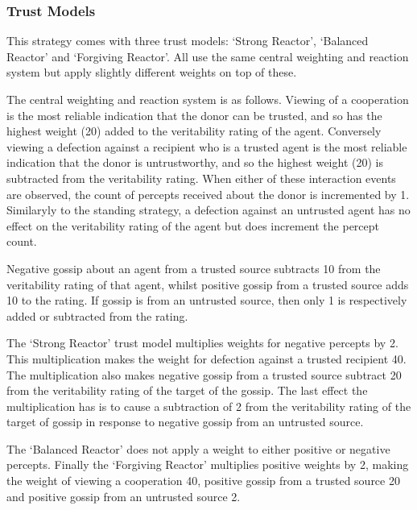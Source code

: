 \documentclass[]{final_report}
\begin{document}
\subsubsection{Trust Models}
This strategy comes with three trust models: `Strong Reactor', `Balanced Reactor' and `Forgiving Reactor'. All use the same central weighting and reaction system but apply slightly different weights on top of these.\par 
The central weighting and reaction system is as follows. Viewing of a cooperation is the most reliable indication that the donor can be trusted, and so has the highest weight (20) added to the veritability rating of the agent. Conversely viewing a defection against a recipient who is a trusted agent is the most reliable indication that the donor is untrustworthy, and so the highest weight (20) is subtracted from the veritability rating. When either of these interaction events are observed, the count of percepts received about the donor is incremented by 1. Similaryly to the standing strategy, a defection against an untrusted agent has no effect on the veritability rating of the agent but does increment the percept count.\par
Negative gossip about an agent from a trusted source subtracts 10 from the veritability rating of that agent, whilst positive gossip from a trusted source adds 10 to the rating. If gossip is from an untrusted source, then only 1 is respectively added or subtracted from the rating.\par 
The `Strong Reactor' trust model multiplies weights for negative percepts by 2. This multiplication makes the weight for defection against a trusted recipient 40. The multiplication also makes negative gossip from a trusted source subtract 20 from the veritability rating of the target of the gossip. The last effect the multiplication has is to cause a subtraction of 2 from the veritability rating of the target of gossip in response to negative gossip from an untrusted source.\par 
The `Balanced Reactor' does not apply a weight to either positive or negative percepts. Finally the `Forgiving Reactor' multiplies positive weights by 2, making the weight of viewing a cooperation 40, positive gossip from a trusted source 20 and positive gossip from an untrusted source 2.
\end{document}
